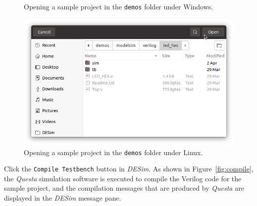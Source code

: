 \documentclass[11pt, twoside, pdftex]{article}
\begin{document}
\begin{figure}[h]
	\begin{center}
        \setlength{\fboxsep}{0pt}
	\end{center}
    \caption{Opening a sample project in the \texttt{demos} folder under Windows.}
	\label{fig:demos_windows}
\end{figure}

\begin{figure}[h]
	\begin{center}
        \setlength{\fboxsep}{0pt}
        \includegraphics[width = .9\textwidth]{figures/DESim_project_linux.png}
	\end{center}
    \caption{Opening a sample project in the \texttt{demos} folder under Linux.}
	\label{fig:demos_linux}
\end{figure}

Click the \texttt{Compile Testbench} button in {\it DESim}. As shown in 
Figure~\ref{fig:compile}, the {\it Questa} simulation software is executed to compile the
Verilog code for the sample project, and the compilation messages that are produced by 
{\it Questa} are displayed in the {\it DESim} message pane.
\end{document}
